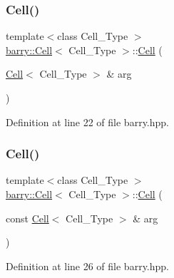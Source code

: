 \subsubsection{\texorpdfstring{Cell()}{Cell()}\hspace{0.1cm}{\footnotesize\ttfamily [3/5]}}
{\footnotesize\ttfamily template$<$class Cell\+\_\+\+Type $>$ \\
\hyperlink{classbarry_1_1_cell}{barry\+::\+Cell}$<$ Cell\+\_\+\+Type $>$\+::\hyperlink{classbarry_1_1_cell}{Cell} (\begin{DoxyParamCaption}\item[{\hyperlink{classbarry_1_1_cell}{Cell}$<$ Cell\+\_\+\+Type $>$ \&}]{arg }\end{DoxyParamCaption})\hspace{0.3cm}{\ttfamily [inline]}}



Definition at line 22 of file barry.\+hpp.

\mbox{\label{classbarry_1_1_cell_a5db94e6e2ad797d4e9b41e73a3a94e32}} 
\subsubsection{\texorpdfstring{Cell()}{Cell()}\hspace{0.1cm}{\footnotesize\ttfamily [4/5]}}
{\footnotesize\ttfamily template$<$class Cell\+\_\+\+Type $>$ \\
\hyperlink{classbarry_1_1_cell}{barry\+::\+Cell}$<$ Cell\+\_\+\+Type $>$\+::\hyperlink{classbarry_1_1_cell}{Cell} (\begin{DoxyParamCaption}\item[{const \hyperlink{classbarry_1_1_cell}{Cell}$<$ Cell\+\_\+\+Type $>$ \&}]{arg }\end{DoxyParamCaption})\hspace{0.3cm}{\ttfamily [inline]}}



Definition at line 26 of file barry.\+hpp.

\mbox{\label{classbarry_1_1_cell_a56d2ab8f2a26b1fd8f3b3b9bfef37c1b}} 
